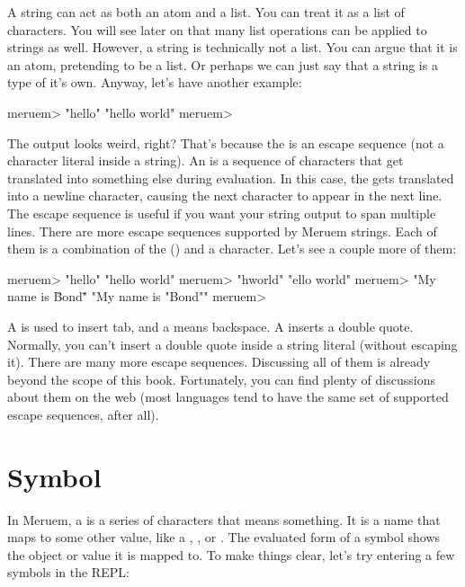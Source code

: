 A string can act as both an atom and a list. You can treat it as a list of characters. You will see later on that many list operations can be applied to strings as well. However, a string is technically not a list. You can argue that it is an atom, pretending to be a list. Or perhaps we can just say that a string is a type of it's own. Anyway, let's have another example:

\begin{REPL}
meruem> "hello\nworld"
"hello
world"
meruem>
\end{REPL}

The output looks weird, right? That's because the  is an escape sequence (not a character literal inside a string). An  is a sequence of characters that get translated into something else during evaluation. In this case, the  gets translated into a newline character, causing the next character to appear in the next line. The escape sequence  is useful if you want your string output to span multiple lines. There are more escape sequences supported by Meruem strings. Each of them is a combination of the  (\code{\textbackslash}) and a character. Let's see a couple more of them:

\begin{REPL}
meruem> "hello\tworld"
"hello	world"
meruem> "h\bello world"
"ello world"
meruem> "My name is \"Bond\""
"My name is "Bond""
meruem> 
\end{REPL}

A  is used to insert tab, and a  means backspace. A  inserts a double quote. Normally, you can't insert a double quote inside a string literal (without escaping it). There are many more escape sequences. Discussing all of them is already beyond the scope of this book. Fortunately, you can find plenty of discussions about them on the web (most languages tend to have the same set of supported escape sequences, after all). 

\section{Symbol}
In Meruem, a  is a series of characters that means something. It is a name that maps to some other value, like a , , or . The evaluated form of a symbol shows the object or value it is mapped to. To make things clear, let's try entering a few symbols in the REPL:

